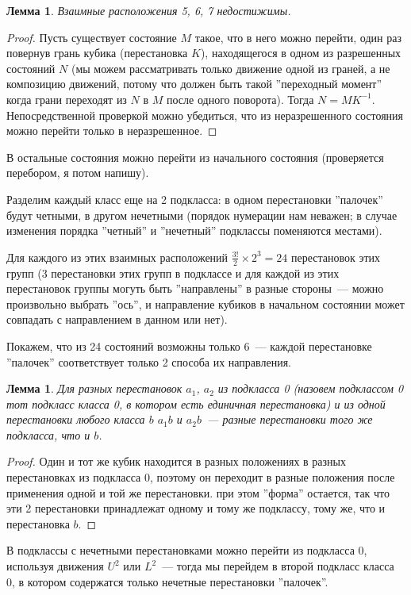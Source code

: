 \documentclass[utf8,a4paper,draft]{article}
\newtheorem*{lemma1_cub}{Лемма}
\newtheorem*{lemma2_cub}{Лемма}
\begin{document}
\begin{lemma1_cub}
Взаимные расположения 5, 6, 7 недостижимы.
\end{lemma1_cub}
\begin{proof}
Пусть существует состояние $M$ такое, что в него можно перейти, один раз повернув грань кубика (перестановка $K$), находящегося в одном из разрешенных состояний $N$ (мы можем рассматривать только движение одной из граней, а не композицию движений, потому что должен быть такой ''переходный момент'' когда грани переходят из $N$ в $M$ после одного поворота). Тогда $N=MK^{-1}$. Непосредственной проверкой можно убедиться, что из неразрешенного состояния можно перейти только в неразрешенное. 
\end{proof}
В остальные состояния можно перейти из начального состояния (проверяется перебором, я потом напишу). 

Разделим каждый класс еще на 2 подкласса: в одном перестановки ''палочек''  будут четными, в другом нечетными (порядок нумерации нам неважен; в случае изменения порядка ''четный'' и ''нечетный'' подклассы поменяются местами).

Для каждого из этих взаимных расположений $\frac{3!}{2}\times 2^3=24$ перестановок этих групп (3 перестановки этих групп в подклассе и для каждой из этих перестановок группы могуть быть ''направлены'' в разные стороны~--- можно произвольно выбрать ''ось'', и направление кубиков в начальном состоянии может совпадать с направлением в данном или нет).

Покажем, что из 24 состояний возможны только 6~--- каждой перестановке ''палочек'' соответствует только 2 способа их направления.
\begin{lemma2_cub}
Для разных перестановок $a_1$, $a_2$ из подкласса 0 (назовем подклассом 0 тот подкласс класса 0, в котором есть единичная перестановка) и из одной перестановки любого класса $b$ $a_1b$ и $a_2b$~--- разные перестановки того же подкласса, что и $b$.
\end{lemma2_cub}
\begin{proof}
Один и тот же кубик находится в разных положениях в разных перестановках из подкласса 0, поэтому он переходит в разные положения после применения одной и той же перестановки. при этом ''форма'' остается, так что эти 2 перестановки принадлежат одному и тому же подклассу, тому же, что и перестановка $b$.
\end{proof}
В подклассы с нечетными перестановками можно перейти из подкласса 0, используя движения $U^2$ или $L^2$~--- тогда мы перейдем в второй подкласс класса 0, в котором содержатся только нечетные перестановки ''палочек''.
\end{document}
